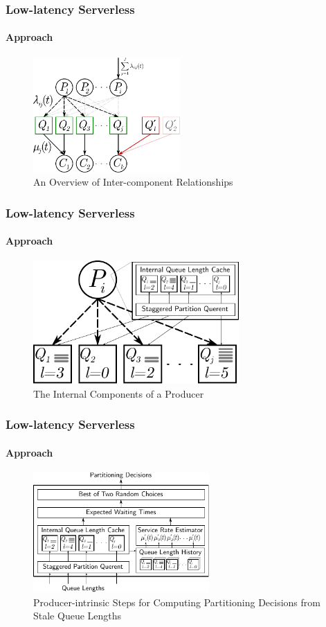 \documentclass[aspectratio=169]{beamer}
\begin{document}
\begin{frame}
	\frametitle{Low-latency Serverless}
	\framesubtitle{Approach}

	\begin{figure}[h]
		\centering
		\includegraphics[width=0.5\textwidth]{diagram}
		\caption{An Overview of Inter-component Relationships}
	\end{figure}
\end{frame}

\begin{frame}
	\frametitle{Low-latency Serverless}
	\framesubtitle{Approach}

	\begin{figure}[h]
		\centering
		\includegraphics[width=0.7\textwidth]{cache}
		\caption{The Internal Components of a Producer}
	\end{figure}
\end{frame}

\begin{frame}
	\frametitle{Low-latency Serverless}
	\framesubtitle{Approach}

	\begin{figure}[h]
		\centering
		\includegraphics[width=0.6\textwidth]{service}
		\caption{Producer-intrinsic Steps for Computing Partitioning Decisions from Stale Queue Lengths}
	\end{figure}
\end{frame}
\end{document}
